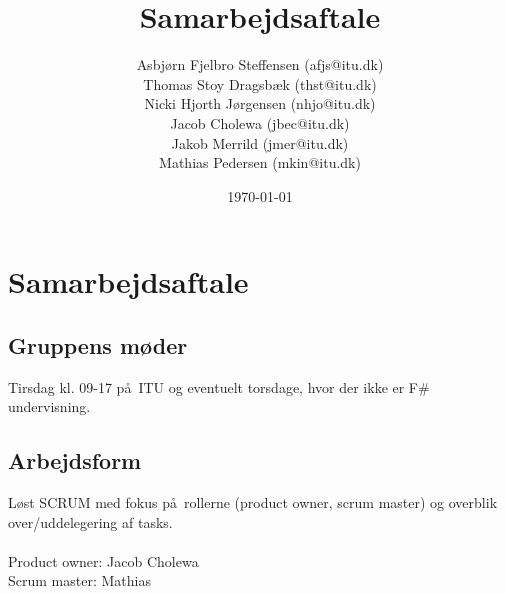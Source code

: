 \documentclass{report}
\title{Samarbejdsaftale}
\date{\today}
\author{Asbj\o rn Fjelbro Steffensen (afjs@itu.dk)\\ Thomas Stoy Dragsb\ae k (thst@itu.dk)\\ Nicki Hjorth J\o rgensen (nhjo@itu.dk)\\ Jacob Cholewa (jbec@itu.dk)\\ Jakob Merrild (jmer@itu.dk)\\ Mathias Pedersen (mkin@itu.dk)}
\begin{document}
\maketitle
\newpage

\chapter{Samarbejdsaftale}

\section{Gruppens m\o der}
Tirsdag kl. 09-17 p\aa \ ITU og eventuelt torsdage, hvor der ikke er F\# undervisning. \\

\section{Arbejdsform}
L\o st SCRUM med fokus p\aa \ rollerne (product owner, scrum master) og overblik over/uddelegering af tasks. \\ \\
Product owner: Jacob Cholewa \\
Scrum master: Mathias
\end{document}
